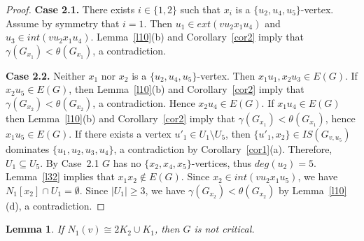 \documentclass[12pt]{article}
\newtheorem{lemma}{Lemma}
\begin{document}
\begin{proof}
\textbf{Case 2.1.} There exists $i \in \{1,2\}$ such that $x_i$ is a $\{u_2,u_4,u_5\}$-vertex. Assume by symmetry that $i = 1$. Then $u_1 \in ext(vu_2x_1u_4)$ and $u_3 \in int(vu_2x_1u_4)$.  Lemma~\ref{l10}(b) and Corollary~\ref{cor2} imply that $\gamma(G_{x_1}) < \theta(G_{x_1})$, a contradiction. 

\textbf{Case 2.2.} Neither $x_1$ nor $x_2$ is a $\{u_2,u_4,u_5\}$-vertex. Then $x_1u_1, x_2u_3 \in E(G)$. If $x_2u_5 \in E(G)$, then Lemma~\ref{l10}(b) and Corollary~\ref{cor2} imply that $\gamma(G_{x_2}) < \theta(G_{x_2})$, a contradiction. Hence $x_2u_4 \in E(G)$. If $x_1u_4 \in E(G)$ then Lemma~\ref{l10}(b) and Corollary~\ref{cor2} imply that $\gamma(G_{x_1}) < \theta(G_{x_1})$, hence $x_1u_5 \in E(G)$. If there exists a vertex $u'_1 \in U_1 \setminus U_5$, then $\{u'_1,x_2\} \in IS(G_{v,u_5})$ dominates $\{u_1,u_2,u_3,u_4\}$, a contradiction by Corollary~\ref{cor1}(a). Therefore, $U_1 \subseteq U_5$. By Case~2.1 $G$ has no $\{x_2,x_4,x_5\}$-vertices, thus $deg(u_2) = 5$. Lemma~\ref{l32} implies that $x_1x_2 \notin E(G)$. Since $x_2 \in int(vu_2x_1u_5)$, we have $N_1[x_2] \cap U_1 = \emptyset$. Since $|U_1| \geq 3$, we have $\gamma(G_{x_2}) < \theta(G_{x_2})$ by Lemma~\ref{l10}(d), a contradiction.
\end{proof}

\begin{lemma}\label{l37}
If $N_1(v) \cong 2K_2 \cup K_1$, then $G$ is not critical.
\end{lemma}
\end{document}
